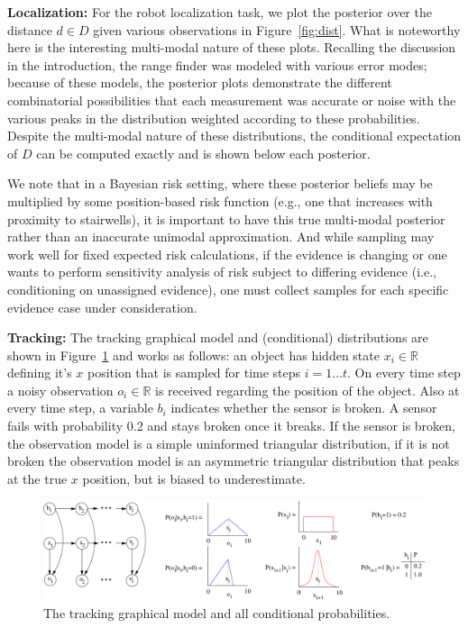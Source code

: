 \documentclass[letterpaper]{article}
\newcommand{\R}{\mathbb{R}}
\begin{document}
{{\bf Localization:} 
For the {robot localization} task, we plot the posterior over the
distance $d \in D$ given various observations in
Figure~\ref{fig:dist}.  What is noteworthy here is the interesting
multi-modal nature of these plots. Recalling the discussion in the
introduction, the range finder was modeled with various error modes;
because of these models, the posterior plots demonstrate the different
combinatorial possibilities that each measurement was accurate or
noise with the various peaks in the distribution weighted according to
these probabilities.  Despite the multi-modal nature of these
distributions, the conditional expectation of $D$ can be computed
exactly and is shown below each posterior.  

We note that in a Bayesian
risk setting, where these posterior beliefs may be multiplied by some
position-based risk function (e.g., one that increases with proximity
to stairwells), it is important to have this true multi-modal
posterior rather than an inaccurate unimodal approximation.  And while
sampling may work well for fixed expected risk calculations, if the
evidence is changing or one wants to perform sensitivity analysis of
risk subject to differing evidence (i.e., conditioning on unassigned
evidence), one must collect samples for each specific evidence case
under consideration.

{\bf Tracking:} 
The {tracking} graphical model and (conditional) distributions
are shown in Figure~\ref{fig:gm3}
and works as follows: an object has hidden state $x_i \in \R$ defining
it's $x$ position that is sampled for time steps $i = 1 \ldots t$.  On
every time step a noisy observation $o_i \in \R$ is received regarding
the position of the object.  Also at every time step, a variable $b_i$
indicates whether the sensor is broken.  A sensor fails with probability
0.2 and stays broken once it breaks.  If the sensor is broken, the
observation model is a simple uninformed triangular distribution, if
it is not broken the observation model is an asymmetric
triangular distribution that peaks at the true $x$ position, but is biased
to underestimate.

\begin{figure}[t!]
\begin{center}
\vspace{-1mm}
\includegraphics[width=.90\textwidth]{gm3.pdf}
\end{center}
\vspace{-6mm}
\caption{\footnotesize The {tracking} graphical model and all conditional probabilities.} \label{fig:gm3}
\end{figure}

}
\end{document}

